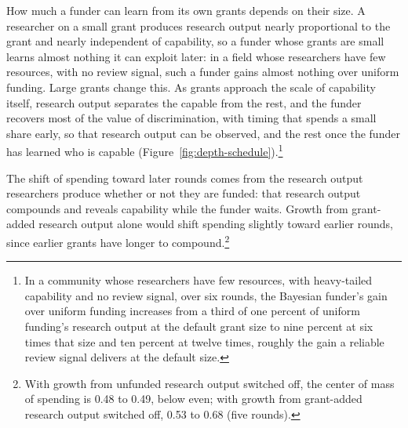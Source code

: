 

How much a funder can learn from its own grants depends on their size. A researcher on a small grant produces research output nearly proportional to the grant and nearly independent of capability, so a funder whose grants are small learns almost nothing it can exploit later: in a field whose researchers have few resources, with no review signal, such a funder gains almost nothing over uniform funding. Large grants change this. As grants approach the scale of capability itself, research output separates the capable from the rest, and the funder recovers most of the value of discrimination, with timing that spends a small share early, so that research output can be observed, and the rest once the funder has learned who is capable (Figure~\ref{fig:depth-schedule}).\footnote{In a community whose researchers have few resources, with heavy-tailed capability and no review signal, over six rounds, the Bayesian funder's gain over uniform funding increases from a third of one percent of uniform funding's research output at the default grant size to nine percent at six times that size and ten percent at twelve times, roughly the gain a reliable review signal delivers at the default size.}



The shift of spending toward later rounds comes from the research output researchers produce whether or not they are funded: that research output compounds and reveals capability while the funder waits. Growth from grant-added research output alone would shift spending slightly toward earlier rounds, since earlier grants have longer to compound.\footnote{With growth from unfunded research output switched off, the center of mass of spending is 0.48 to 0.49, below even; with growth from grant-added research output switched off, 0.53 to 0.68 (five rounds).}


